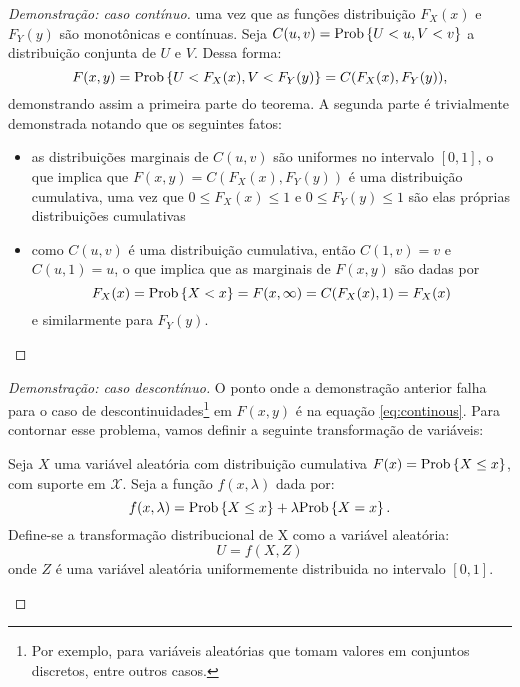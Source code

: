 \begin{Teorema}
\begin{proof}[Demonstração: caso contínuo]
uma vez que as funções distribuição $F_X(x)$ e $F_Y(y)$ são monotônicas e contínuas. Seja $C(u,v) = \mathrm{Prob}\left\{U < u, V < v\right\}$ a distribuição conjunta de $U$ e $V$. Dessa forma:
\[
 F(x, y) = \mathrm{Prob}\left\{U < F_X(x), V < F_Y(y)\right\} = C(F_X(x), F_Y(y)),
\]
demonstrando assim a primeira parte do teorema. A segunda parte é trivialmente demonstrada notando que os seguintes fatos: 
\begin{itemize}
 \item as distribuições marginais de $C(u,v)$ são uniformes no intervalo $[0,1]$, o que implica que $F(x,y) = C(F_X(x), F_Y(y))$ é uma distribuição cumulativa, uma vez que $0\le F_X(x)\le1$ e $0\le F_Y(y)\le1$ são elas próprias distribuições cumulativas 
 \item como $C(u, v)$ é uma distribuição cumulativa, então $C(1, v) = v$ e $C(u,1)= u$, o que implica que as marginais de $F(x,y)$ são dadas por
 \[
  F_X(x) = \mathrm{Prob}\left\{X < x\right\} = F(x, \infty) = C(F_X(x), 1) = F_X(x)
 \]
 e similarmente para $F_Y(y)$.
\end{itemize}
\end{proof}
\begin{proof}[Demonstração: caso descontínuo]
O ponto onde a demonstração anterior falha para o caso de descontinuidades\footnote{Por exemplo, para variáveis aleatórias que tomam valores em conjuntos discretos, entre outros casos.} em $F(x,y)$  é na equação \eqref{eq:continous}. Para contornar esse problema, vamos definir a seguinte transformação de variáveis:

\begin{Definicao} 
Seja $X$ uma variável aleatória com distribuição cumulativa $F(x) = \mathrm{Prob}\left\{ X \le x\right\}$, com suporte em $\mathcal{X}$. Seja a função $f(x, \lambda)$ dada por:
\[
 f(x, \lambda) = \mathrm{Prob}\left\{X \le x\right\} + \lambda \mathrm{Prob}\left\{X = x\right\}.
\]
Define-se a transformação distribucional de X como a variável aleatória:
\[
 U = f(X, Z) 
\]
onde $Z$ é uma variável aleatória uniformemente distribuida no intervalo $[0,1]$.
\end{Definicao}


\end{proof}
\end{Teorema}

